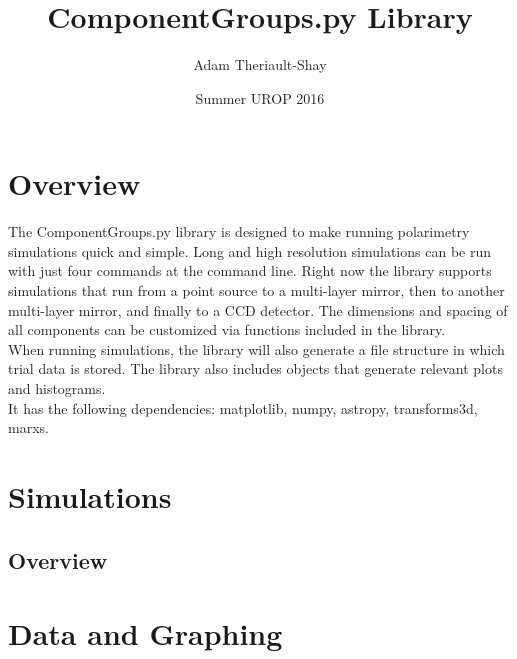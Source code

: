 \documentclass[11pt, oneside]{ltxdoc}   	%
\title{ComponentGroups.py Library}
\author{Adam Theriault-Shay}
\date{Summer UROP 2016}							%
\begin{document}
\maketitle
\section{Overview}
The ComponentGroups.py library is designed to make running polarimetry simulations quick and simple. Long and high resolution simulations can be run with just four commands at the command line. Right now the library supports simulations that run from a point source to a multi-layer mirror, then to another multi-layer mirror, and finally to a CCD detector. The dimensions and spacing of all components can be customized via functions included in the library.\\
When running simulations, the library will also generate a file structure in which trial data is stored. The library also includes objects that generate relevant plots and histograms.\\
It has the following dependencies: matplotlib, numpy, astropy, transforms3d, marxs.

\section{Simulations}
\subsection{Overview}
\section{Data and Graphing}
\end{document}
